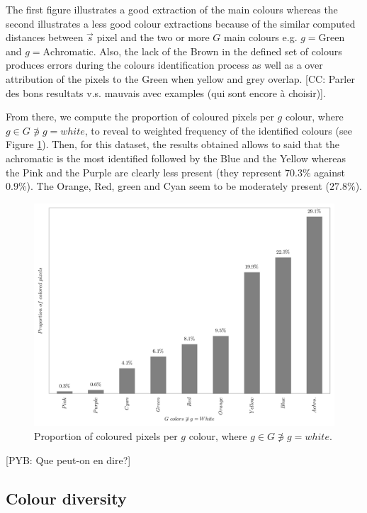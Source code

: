 \documentclass[11pt,a4paper]{article}
\begin{document}
\noindent The first figure illustrates a good extraction of the main colours whereas the second illustrates a less good colour extractions because of the similar computed distances between $\vec{s}$  pixel and the two or more $G$ main colours e.g. $g = \mbox{Green}$ and $g = \mbox{Achromatic}$. Also, the lack of the Brown in the defined set of colours produces errors during the colours identification process as well as a over attribution of the pixels to the Green when yellow and grey overlap. [CC:  Parler des bons resultats v.s. mauvais avec examples (qui sont encore \`a choisir)].

From there, we compute the proportion of coloured pixels per $g$ colour, where $g \in G \not\ni g = white$, to reveal to weighted frequency of the identified colours (see Figure \ref{fig:propcolours}). Then, for this dataset, the results obtained allows to said that the achromatic is the most identified followed by the Blue and the Yellow whereas the Pink and the Purple are clearly less present (they represent $70.3\%$ against $0.9\%$). The Orange, Red, green and Cyan seem to be moderately present ($27.8\%$).

\begin{figure}[!h]
	\centering
	\includegraphics[width=\linewidth]{figures/colors-barplot.png}
	\caption{Proportion of coloured pixels per $g$ colour, where $g \in G \not\ni g = white$.}
	\label{fig:propcolours}
\end{figure}

 [PYB: Que peut-on en dire?]

\subsection{Colour diversity}
\end{document}
